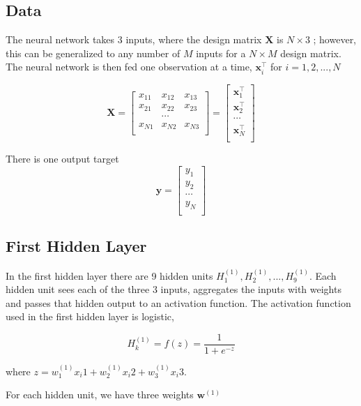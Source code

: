 \documentclass[12pt]{article}%
\begin{document}
\subsection{Data}

	The neural network takes 3 inputs, where the design matrix $\mathbf{X}$ is $N \times 3$ ; however, this can be generalized to any number of $M$ inputs for a  $N \times M$ design matrix. The neural network is then fed one observation at a time, $\mathbf{x}^\intercal_i$ for $i = 1, 2, ..., N$
	
	$$
	\mathbf{X} = \begin{bmatrix}
	x_{11} & x_{12} & x_{13} \\
	x_{21} & x_{22} & x_{23} \\
	 & \cdots & \\
	x_{N1} & x_{N2} & x_{N3} \\
	\end{bmatrix} = 
	\begin{bmatrix}
	\mathbf{x}^\intercal_1 \\
	\mathbf{x}^\intercal_2 \\
	 \cdots \\
	\mathbf{x}^\intercal_N \\
	\end{bmatrix}
	$$

	There is one output target 
	$$
	\mathbf{y} = \begin{bmatrix}
	y_1 \\
	y_2 \\
 	 \cdots \\
 	y_N \\
	\end{bmatrix}
	$$
	

\subsection{First Hidden Layer}

	In the first hidden layer there are 9 hidden units $H^{(1)}_1, H^{(1)}_2, ..., H^{(1)}_9$. Each hidden unit sees each of the three 3 inputs, aggregates the inputs with weights and passes that hidden output to an activation function. The activation function used in the first hidden layer is logistic,
	
	$$
	H^{(1)}_k = f(z) = \frac{1}{1 + e^{-z}}
	$$
	
	where $z = w^{(1)}_1 x_i1 + w^{(1)}_2 x_i2 + w^{(1)}_3 x_i3$.
	
	For each hidden unit, we have three weights $\mathbf{w}^{(1)}$
\end{document}
